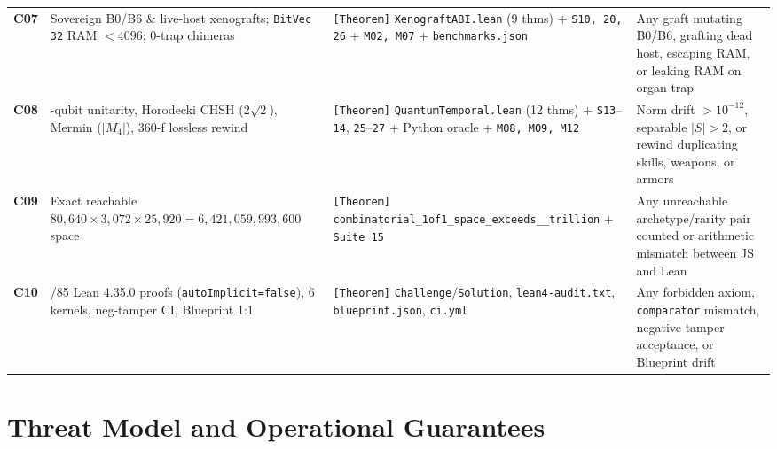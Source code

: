 \documentclass[11pt,letterpaper]{article}
\theoremstyle{remark}
\begin{document}
\begin{table}[ht]
\begin{tabular}{@{} c >{\raggedright\arraybackslash}p{4.3cm} >{\raggedright\arraybackslash}p{4.8cm} >{\raggedright\arraybackslash}p{5.5cm} @{}}
\textbf{C07} & Sovereign B0/B6 \& live-host xenografts; \texttt{BitVec 32} RAM $<4096$; 0-trap chimeras & \texttt{[Theorem]} \texttt{XenograftABI.lean} (9 thms) + \texttt{S10, 20, 26} + \texttt{M02, M07} + \texttt{benchmarks.json} & Any graft mutating B0/B6, grafting dead host, escaping RAM, or leaking RAM on organ trap \\
\textbf{C08} & 4-qubit unitarity, Horodecki CHSH ($2\sqrt{2}$), Mermin ($|M_4|$), 360-f lossless rewind & \texttt{[Theorem]} \texttt{QuantumTemporal.lean} (12 thms) + \texttt{S13}--\texttt{14}, \texttt{25}--\texttt{27} + Python oracle + \texttt{M08, M09, M12} & Norm drift $>10^{-12}$, separable $|S|>2$, or rewind duplicating skills, weapons, or armors \\
\textbf{C09} & Exact reachable $80{,}640\times 3{,}072\times 25{,}920 = 6{,}421{,}059{,}993{,}600$ space & \texttt{[Theorem]} \texttt{combinatorial\_\allowbreak 1of1\_\allowbreak space\_\allowbreak exceeds\_\allowbreak 6\_\allowbreak trillion} + \texttt{Suite 15} & Any unreachable archetype/rarity pair counted or arithmetic mismatch between JS and Lean \\
\textbf{C10} & 85/85 Lean 4.35.0 proofs (\texttt{autoImplicit=false}), 6 kernels, neg-tamper CI, Blueprint 1:1 & \texttt{[Theorem]} \texttt{Challenge}/\allowbreak\texttt{Solution}, \texttt{lean4-audit.txt}, \texttt{blueprint.json}, \texttt{ci.yml} & Any forbidden axiom, \texttt{comparator} mismatch, negative tamper acceptance, or Blueprint drift \\
\bottomrule
\end{tabular}
\end{table}

\section{Threat Model and Operational Guarantees}
\label{sec:goals}
\end{document}
